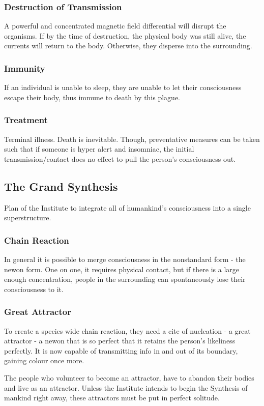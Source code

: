 \documentclass[11pt]{article}
\begin{document}
		\subsubsection{Destruction of Transmission}
		A powerful and concentrated magnetic field differential will disrupt the organisms.
		If by the time of destruction, the physical body was still alive, the currents will return to the body.
		Otherwise, they disperse into the surrounding.
		\subsubsection{Immunity}
		If an individual is unable to sleep, they are unable to let their consciousness escape their body, thus immune to death by this plague.
		\subsubsection{Treatment}
		Terminal illness. 
		Death is inevitable.
		Though, preventative measures can be taken such that if someone is hyper alert and insomniac, the initial transmission/contact does no effect to pull the person's consciousness out.
		\newpage
		
	\subsection{The Grand Synthesis}
	Plan of the Institute to integrate all of humankind's consciousness into a single superstructure.
		\subsubsection{Chain Reaction}
		In general it is possible to merge consciousness in the nonstandard form - the newon form. 
		One on one, it requires physical contact, but if there is a large enough concentration, people in the surrounding can spontaneously lose their consciousness to it.
		\subsubsection{Great Attractor}
		To create a species wide chain reaction, they need a cite of nucleation - a great attractor - a newon that is so perfect that it retains the person's likeliness perfectly. It is now capable of transmitting info in and out of its boundary, gaining colour once more.
		
		The people who volunteer to become an attractor, have to abandon their bodies and live as an attractor. Unless the Institute intends to begin the Synthesis of mankind right away, these attractors must be put in perfect solitude. 
		
\end{document}
